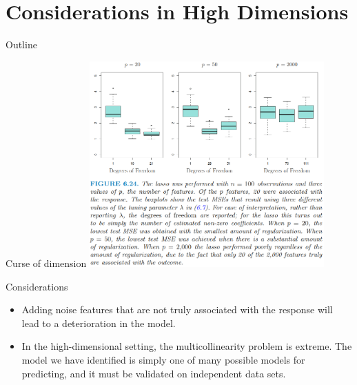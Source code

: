 \documentclass{beamer}
\begin{document}
	\section{Considerations in High Dimensions}
	\begin{frame}{Outline}
		\tableofcontents[currentsection]
	\end{frame}
	\begin{frame}{Curse of dimension}
		\includegraphics[width=9cm]{figure_6.24.png}
	\end{frame}
	\begin{frame}{Considerations}
		\begin{itemize}
			\item Adding noise features that are not truly associated with the response will lead to a deterioration in the model.
			\item In the high-dimensional setting, the multicollinearity problem is extreme. The model we have identified is simply one of many possible models for predicting, and it must be validated on independent data sets.
		\end{itemize}
	\end{frame}
\end{document}
